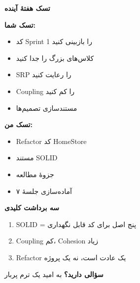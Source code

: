 \documentclass[14pt, a4paper, landscape]{extarticle}
\newcommand{\slide}[1]{%
    \newpage
    \begin{center}
    \begin{minipage}[t]{0.95\textwidth}
    \vspace{0.5cm}
    #1
    \vspace{0.5cm}
    \end{minipage}
    \end{center}
}
\newcommand{\slidetitle}[1]{%
    \begin{center}
        {\LARGE\bfseries\textcolor{primary}{#1}}
    \end{center}
    \vspace{0.5cm}
}
\newcommand{\myaccent}[1]{\textcolor{accent}{#1}}
\begin{document}
\slide{
    \slidetitle{تسک هفتهٔ آینده}
    \vspace{0.5cm}
    \begin{minipage}[t]{0.48\textwidth}
        {\bfseries\textcolor{primary}{تسک شما:}}
        \vspace{0.3cm}
        \begin{itemize}[itemsep=0.3em]
            \item کد Sprint 1 را بازبینی کنید
            \item کلاس‌های بزرگ را جدا کنید
            \item SRP را رعایت کنید
            \item Coupling را کم کنید
            \item مستندسازی تصمیم‌ها
        \end{itemize}
    \end{minipage}
    \hfill
    \begin{minipage}[t]{0.48\textwidth}
        {\bfseries\myaccent{تسک من:}}
        \vspace{0.3cm}
        \begin{itemize}[itemsep=0.3em]
            \item Refactor کد HomeStore
            \item مستند SOLID
            \item جزوهٔ مطالعه
            \item آماده‌سازی جلسهٔ ۷
        \end{itemize}
    \end{minipage}
}

\slide{
    \slidetitle{سه برداشت کلیدی}
    \vspace{1cm}
    \begin{enumerate}[itemsep=0.8em]
        \item {\large SOLID = پنج اصل برای کد قابل نگهداری}
        \item {\large Coupling کم، Cohesion زیاد}
        \item {\large Refactor یک عادت است، نه یک پروژه}
    \end{enumerate}
}

\slide{
    \begin{center}
        \vspace{3cm}
        {\Huge\bfseries سؤالی دارید؟}
        \vspace{1.5cm}
        {\LARGE\myaccent{به امید یک ترم پربار}}
    \end{center}
}
\end{document}
